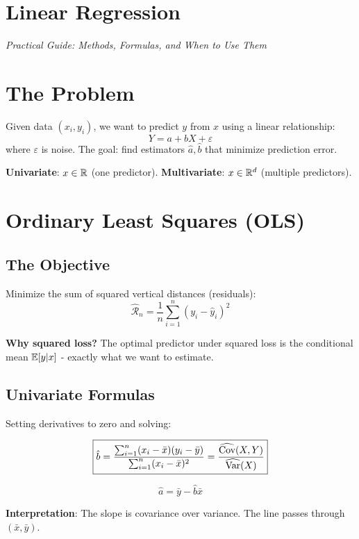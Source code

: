\documentclass[main.tex]{subfiles}
\begin{document}
\section*{\Huge\textcolor{mantis}{Linear Regression}}
\vspace{-0.3cm}
{\large\textit{Practical Guide: Methods, Formulas, and When to Use Them}}
\vspace{0.5cm}

\section{The Problem}

Given data $(x_i, y_i)$, we want to predict $y$ from $x$ using a linear relationship:
$$Y = a + bX + \varepsilon$$
where $\varepsilon$ is noise. The goal: find estimators $\hat{a}, \hat{b}$ that minimize prediction error.

\textbf{Univariate}: $x \in \mathbb{R}$ (one predictor). \textbf{Multivariate}: $x \in \mathbb{R}^d$ (multiple predictors).

\section{Ordinary Least Squares (OLS)}

\subsection{The Objective}

Minimize the sum of squared vertical distances (residuals):
$$\hat{\mathcal{R}}_n = \frac{1}{n} \sum_{i=1}^{n} (y_i - \hat{y}_i)^2$$

\textbf{Why squared loss?} The optimal predictor under squared loss is the conditional mean $\mathbb{E}[y|x]$ - exactly what we want to estimate.

\subsection{Univariate Formulas}

Setting derivatives to zero and solving:

$$\boxed{\hat{b} = \frac{\sum_{i=1}^{n} (x_i - \bar{x})(y_i - \bar{y})}{\sum_{i=1}^{n} (x_i - \bar{x})^2} = \frac{\widehat{\text{Cov}}(X, Y)}{\widehat{\text{Var}}(X)}}$$

$$\boxed{\hat{a} = \bar{y} - \hat{b}\bar{x}}$$

\textbf{Interpretation}: The slope is covariance over variance. The line passes through $(\bar{x}, \bar{y})$.
\end{document}
